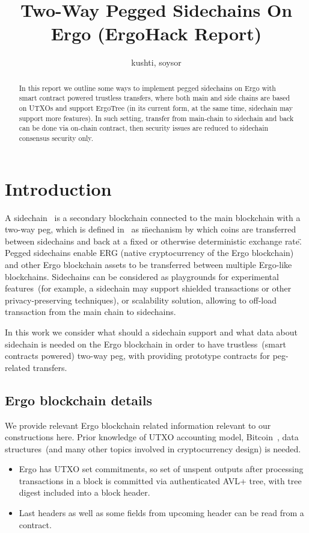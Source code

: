 \documentclass{article}   %
\begin{document}
\title{Two-Way Pegged Sidechains On Ergo (ErgoHack Report)}
\author{kushti, soysor}


\maketitle

\begin{abstract}
In this report we outline some ways to implement pegged sidechains on Ergo with smart contract powered trustless transfers, where both main and
  side chains are based on UTXOs and support ErgoTree (in its current form, at the same time, sidechain may support more features).
In such setting, transfer from main-chain to sidechain and back can be done via on-chain contract, then security issues are reduced to
  sidechain consensus security only.
\end{abstract}


\section{Introduction}

A sidechain~\cite{back2014enabling} is a secondary blockchain connected to the main blockchain with a two-way peg, which is defined
 in~\cite{back2014enabling} as \"mechanism by which coins are transferred between sidechains and
back at a fixed or otherwise deterministic exchange rate\". Pegged sidechains enable ERG (native cryptocurrency of the Ergo blockchain)
and other Ergo blockchain assets to be transferred between multiple Ergo-like blockchains. Sidechains can be considered as playgrounds for experimental features~(for example, a sidechain may support shielded transactions or other privacy-preserving
techniques), or scalability solution, allowing to off-load transaction from the main chain to sidechains.

In this work we consider what should a sidechain support and what data about sidechain is needed on the Ergo blockchain in
order to have trustless~(smart contracts powered) two-way peg, with providing prototype contracts for peg-related transfers.

\subsection{Ergo blockchain details}

We provide relevant Ergo blockchain related information relevant to our constructions here. Prior knowledge of UTXO
accounting model, Bitcoin~\cite{nakamoto2009}, data structures~(and many other topics involved in cryptocurrency design) is needed.
\begin{itemize}
\item{} Ergo has UTXO set commitments, so set of unspent outputs after processing transactions in a block is committed via
authenticated AVL+ tree, with tree digest included into a block header.
\item{} Last headers as well as some fields from upcoming header can be read from a contract.
\end{itemize}
\end{document}
